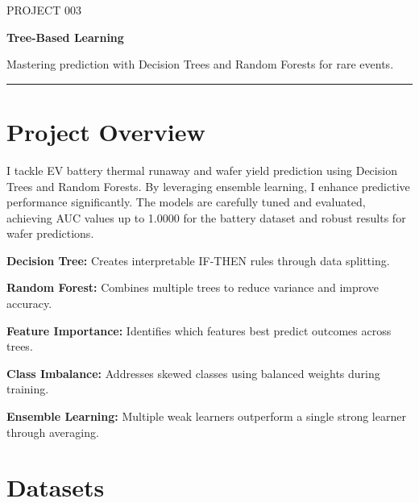 \documentclass[11pt,a4paper]{article}
\begin{document}
\thispagestyle{empty}

{\colorbox{primary}{}}

\vspace{6pt}

{\fontsize{9}{11}\selectfont\color{codemuted}PROJECT 003}

\vspace{1pt}
{\fontsize{22}{27}\selectfont\bfseries\color{titleblue} Tree-Based Learning}

\vspace{2pt}
{\normalsize\color{accent} Mastering prediction with Decision Trees and Random Forests for rare events.}

\vspace{4pt}
{\color{tableheader}\rule{\linewidth}{0.4pt}}

\vspace{3pt}

\section{Project Overview}

I tackle EV battery thermal runaway and wafer yield prediction using Decision Trees and Random Forests. By leveraging ensemble learning, I enhance predictive performance significantly. The models are carefully tuned and evaluated, achieving AUC values up to 1.0000 for the battery dataset and robust results for wafer predictions.

\textbf{Decision Tree:} Creates interpretable IF-THEN rules through data splitting.

\textbf{Random Forest:} Combines multiple trees to reduce variance and improve accuracy.

\textbf{Feature Importance:} Identifies which features best predict outcomes across trees.

\textbf{Class Imbalance:} Addresses skewed classes using balanced weights during training.

\textbf{Ensemble Learning:} Multiple weak learners outperform a single strong learner through averaging.


\section{Datasets}
\end{document}

